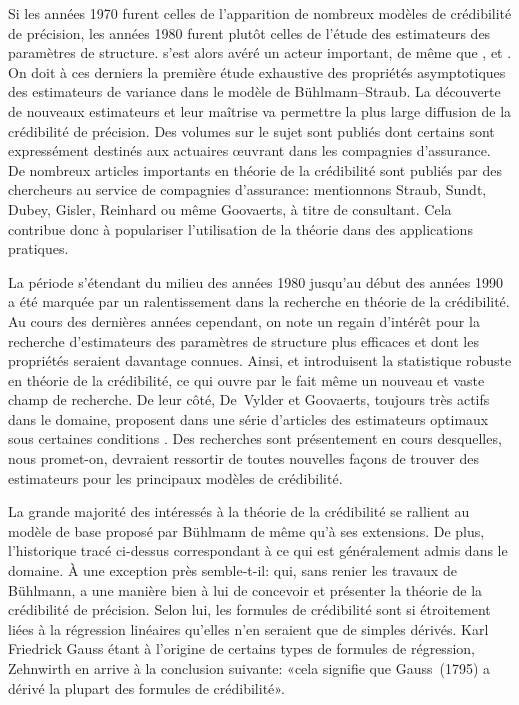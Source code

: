 Si les années 1970 furent celles de l'apparition de nombreux modèles de
crédibilité de précision, les années 1980 furent plutôt celles de
l'étude des estimateurs des paramètres de structure.
\citet{DeVylder:estimation:1978,DeVylder:estimation:1981,DeVylder:estimation:PCiI:1984}
s'est alors avéré un acteur important, de même que
\citet{Norberg:empiricalbayes:1980}, \citet{Gisler:trimming:1980} et
\citet{Dubey:estimation:1981}. On doit à ces derniers la première étude
exhaustive des propriétés asymptotiques des estimateurs de variance
dans le modèle de Bühlmann--Straub. La découverte de nouveaux
estimateurs et leur maîtrise va permettre la plus large diffusion de
la crédibilité de précision. Des volumes sur le sujet sont publiés
\citep{Goovaerts:EAM:1990} dont certains
\citep{Goovaerts:credibility:1987} sont expressément destinés aux
actuaires {\oe}uvrant dans les compagnies d'assurance. De nombreux
articles importants en théorie de la crédibilité sont publiés par des
chercheurs au service de compagnies d'assurance: mentionnons Straub,
Sundt, Dubey, Gisler, Reinhard ou même Goovaerts, à titre de
consultant. Cela contribue donc à populariser l'utilisation de la
théorie dans des applications pratiques.

La période s'étendant du milieu des années 1980 jusqu'au début des
années 1990 a été marquée par un ralentissement dans la recherche en
théorie de la crédibilité. Au cours des dernières années cependant, on
note un regain d'intérêt pour la recherche d'estimateurs des
paramètres de structure plus efficaces et dont les propriétés seraient
davantage connues. Ainsi, \citet{Kunsch:robust:1992} et
\citet{Gisler:robust:1993} introduisent la statistique robuste en
théorie de la crédibilité, ce qui ouvre par le fait même un nouveau et
vaste champ de recherche. De leur côté, De~Vylder et Goovaerts,
toujours très actifs dans le domaine, proposent dans une série
d'articles des estimateurs optimaux sous certaines conditions
\citep{DeVylder:zeroexcess:summary:1991,%
  DeVylder:zeroexcess:classical:1992,%
  DeVylder:zeroexcess:BS:1992}. Des recherches sont présentement en
cours desquelles, nous promet-on, devraient ressortir de toutes
nouvelles façons de trouver des estimateurs pour les principaux
modèles de crédibilité.

La grande majorité des intéressés à la théorie de la crédibilité se
rallient au modèle de base proposé par Bühlmann de même qu'à ses
extensions. De plus, l'historique tracé ci-dessus correspondant à ce
qui est généralement admis dans le domaine. À une exception près
semble-t-il: \citet{Zehnwirth:studyguide:1991} qui, sans renier les
travaux de Bühlmann, a une manière bien à lui de concevoir et
présenter la théorie de la crédibilité de précision. Selon lui, les
formules de crédibilité sont si étroitement liées à la régression
linéaires qu'elles n'en seraient que de simples dérivés. Karl
Friedrick Gauss étant à l'origine de certains types de formules de
régression, Zehnwirth en arrive à la conclusion suivante: «cela
signifie que Gauss~(1795) a dérivé la plupart des formules de
crédibilité».

